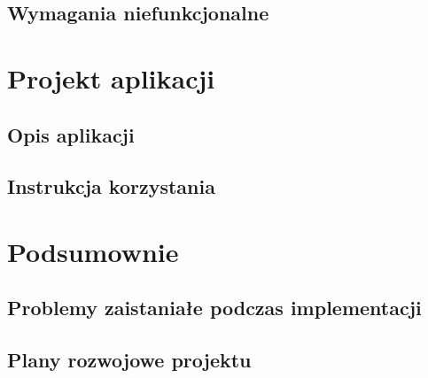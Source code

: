 \documentclass[eng,printmode]{mgr}
\begin{document}
\section{Wymagania niefunkcjonalne}
\chapter{Projekt aplikacji}
\section{Opis aplikacji}
\section{Instrukcja korzystania}
\chapter{Podsumownie}
\section{Problemy zaistaniałe podczas implementacji}
\section{Plany rozwojowe projektu}

\end{document}
